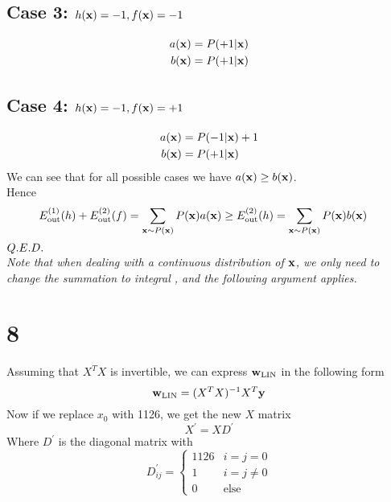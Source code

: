 \documentclass[11pt]{article}
\let\mathbb\relax
\theoremstyle{definition}
\begin{document}
\subsection*{Case 3: $h(\vb{x}) = -1, f(\vb{x})= -1$} 
\begin{align*}
  a(\vb{x}) &= P(+1|\vb{x}) \\ 
  b(\vb{x}) &= P(+1|\vb{x}) \\ 
\end{align*}
\subsection*{Case 4: $h(\vb{x}) = -1, f(\vb{x})= +1$} 
\begin{align*}
  a(\vb{x}) &= P(-1|\vb{x}) + 1 \\ 
  b(\vb{x}) &= P(+1|\vb{x}) \\
\end{align*}
We can see that for all possible cases we have $a(\vb{x}) \geq b(\vb{x})$. \\ 
Hence 
\begin{align*}
  E^{(1)}_{\text{out}}(h) + E^{(2)}_{\text{out}}(f) &= \sum_{\vb{x}\sim P(\vb{x})}P(\vb{x})a(\vb{x}) \geq E^{(2)}_{\text{out}}(h) = \sum_{\vb{x}\sim P(\vb{x})}P(\vb{x})b(\vb{x})
\end{align*}
$\mathbb{Q}.\mathbb{E}.\mathbb{D}.$ \\
\medbreak
\textit{Note that when dealing with a continuous distribution of $\vb{x}$, we only need to change the summation to integral , and the following argument applies.}
\newpage
\section*{8}
Assuming that $X^TX$ is invertible, we can express $\vb{w}_{\text{LIN}}$ in the following form
\[
  \vb{w}_{\text{LIN}} = (X^TX)^{-1}X^T \vb{y}
\]
Now if we replace $x_0$ with 1126, we get the new $X$ matrix
\[
  X^\prime = XD^\prime
\]
Where $D^\prime$ is the diagonal matrix with 
\[
  D^\prime_{ij} = 
  \begin{cases}
    1126 & i = j = 0 \\
    1 & i = j \neq 0 \\
    0 & \text{else}
  \end{cases}
\]
\end{document}
